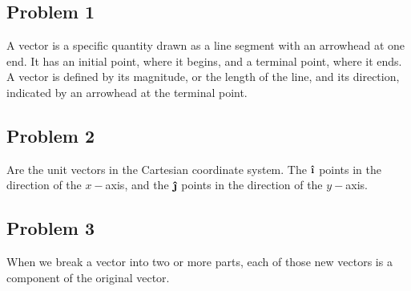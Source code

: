 \documentclass[12pt]{article}
\newcommand{\ihat}{\boldsymbol{\hat{\textbf{\i}}}}
\newcommand{\jhat}{\boldsymbol{\hat{\textbf{\j}}}}
\begin{document}
\subsection*{Problem 1}
A vector is a specific quantity drawn as a line segment with an arrowhead at one end. It has an initial point, where it begins, and a terminal point, where it ends. A vector is defined by its magnitude, or the length of the line, and its direction, indicated by an arrowhead at the terminal point.

\subsection*{Problem 2}
Are the unit vectors in the Cartesian coordinate system. The \(\ihat\) points in the direction of the \(x-\)axis, and the \(\jhat\) points in the direction of the \(y-\)axis.
\subsection*{Problem 3}
When we break a vector into two or more parts, each of those new vectors is a component of the original vector.
\end{document}
